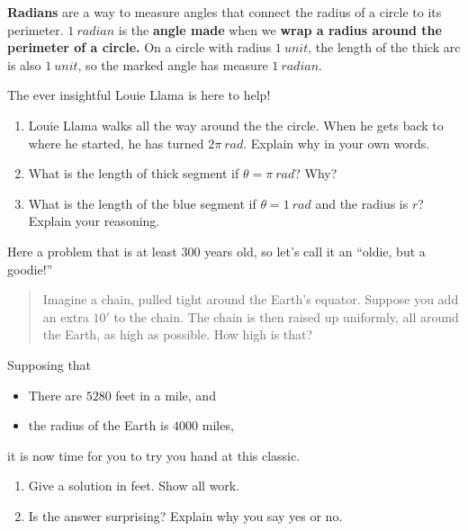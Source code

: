 \documentclass[noauthor,nooutcomes,handout]{ximera}
\begin{document}
\begin{question}
\textbf{Radians} are a way to measure angles that connect the radius
of a circle to its perimeter. $1 \ radian$ is the \textbf{angle made}
when we \textbf{wrap a radius around the perimeter of a circle.} On a
circle with radius $1\ unit$, the length of the thick arc is also
$1\ unit$, so the marked angle has measure $1 \ radian$.


\begin{center}
 
\end{center}

The ever insightful Louie Llama is here to help!

\begin{enumerate}
    \item Louie Llama walks all the way around the  the circle. When he gets back to where he started, he has turned $2\pi \ rad$. Explain why in your own words. 
    \item What is the length of thick segment if $\theta=\pi \ rad$? Why?
    \item What is the length of the blue segment if $\theta=1 \ rad$ and the radius is $r$? Explain your reasoning.
\end{enumerate}
\end{question}
\mynewpage












\begin{question} %
  Here a problem that is at least $300$ years old, so let's call it an  ``oldie, but a goodie!''
  \begin{quote}
    Imagine a chain, pulled tight around the Earth's equator. Suppose
    you add an extra $10'$ to the chain. The chain is then raised up
    uniformly, all around the Earth, as high as possible. How high is
    that?
  \end{quote}
  Supposing that
  \begin{itemize}
  \item There are $5280$ feet in a mile, and
  \item the radius of the Earth is $4000$ miles,
  \end{itemize}
  it is now time for you to try you hand at this classic.
  \begin{enumerate}
  \item Give a solution in feet. Show all work.
  \item Is the answer surprising? Explain why you say yes or no.
  \end{enumerate}
\end{question}
\end{document}
